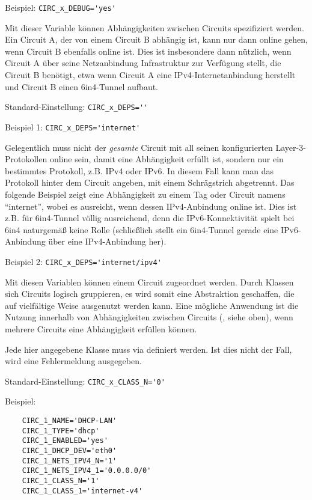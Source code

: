 \begin{description}
Beispiel: \verb+CIRC_x_DEBUG='yes'+


Mit dieser Variable können Abhängigkeiten zwischen Circuits spezifiziert
werden. Ein Circuit A, der von einem Circuit B abhängig ist, kann nur dann
online gehen, wenn Circuit B ebenfalls online ist. Dies ist insbesondere dann
nützlich, wenn Circuit A über seine Netzanbindung Infrastruktur zur Verfügung
stellt, die Circuit B benötigt, etwa wenn Circuit A eine IPv4-Internetanbindung
herstellt und Circuit B einen 6in4-Tunnel aufbaut.

Standard-Einstellung: \verb+CIRC_x_DEPS=''+

Beispiel 1: \verb+CIRC_x_DEPS='internet'+

Gelegentlich muss nicht der \emph{gesamte} Circuit mit all seinen konfigurierten
Layer-3-Proto\-kollen online sein, damit eine Abhängigkeit erfüllt ist, sondern
nur ein bestimmtes Protokoll, z.B. IPv4 oder IPv6. In diesem Fall kann man das
Protokoll hinter dem Circuit angeben, mit einem Schrägstrich abgetrennt.
Das folgende Beispiel zeigt eine Abhängigkeit zu einem Tag oder Circuit namens
``internet'', wobei es ausreicht, wenn dessen IPv4-Anbindung online ist. Dies
ist z.B. für 6in4-Tunnel völlig ausreichend, denn die IPv6-Konnektivität spielt
bei 6in4 naturgemäß keine Rolle (schließlich stellt ein 6in4-Tunnel gerade eine
IPv6-Anbindung über eine IPv4-Anbindung her).

Beispiel 2: \verb+CIRC_x_DEPS='internet/ipv4'+


Mit diesen Variablen können einem Circuit 
zugeordnet werden. Durch Klassen sich Circuits logisch gruppieren, es wird
somit eine Abstraktion geschaffen, die auf vielfältige Weise ausgenutzt werden
kann. Eine mögliche Anwendung ist die Nutzung innerhalb von Abhängigkeiten
zwischen Circuits (, siehe oben), wenn mehrere Circuits eine
Abhängigkeit erfüllen können.

Jede hier angegebene Klasse muss via
 definiert werden. Ist dies
nicht der Fall, wird eine Fehlermeldung ausgegeben.

Standard-Einstellung: \verb+CIRC_x_CLASS_N='0'+

Beispiel:

\begin{example}
\begin{verbatim}
    CIRC_1_NAME='DHCP-LAN'
    CIRC_1_TYPE='dhcp'
    CIRC_1_ENABLED='yes'
    CIRC_1_DHCP_DEV='eth0'
    CIRC_1_NETS_IPV4_N='1'
    CIRC_1_NETS_IPV4_1='0.0.0.0/0'
    CIRC_1_CLASS_N='1'
    CIRC_1_CLASS_1='internet-v4'


\end{verbatim}
\end{example}
\end{description}
